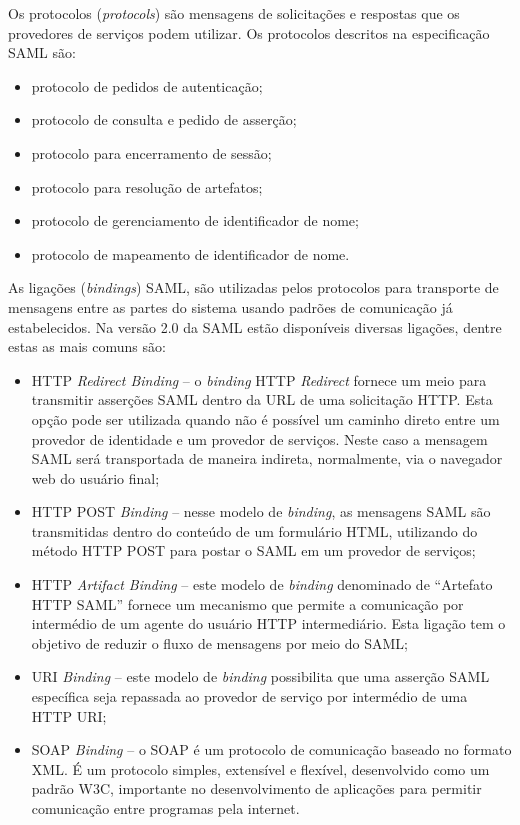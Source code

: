 Os protocolos (\textit{protocols}) são mensagens de solicitações e respostas que os provedores de serviços podem utilizar. Os protocolos descritos na especificação SAML são:

\begin{itemize}
 \item protocolo de pedidos de autenticação;
 \item protocolo de consulta e pedido de asserção;
 \item protocolo para encerramento de sessão;
 \item protocolo para resolução de artefatos;
 \item protocolo de gerenciamento de identificador de nome;
 \item protocolo de mapeamento de identificador de nome.
\end{itemize}

As ligações (\textit{bindings}) SAML, são utilizadas pelos protocolos para transporte de mensagens entre as partes do sistema usando padrões de comunicação já estabelecidos. Na versão 2.0 da SAML estão disponíveis diversas ligações, dentre estas as mais comuns são:

\begin{itemize}
 \item HTTP \textit{Redirect Binding} -- o \textit{binding} HTTP \textit{Redirect} fornece um meio para transmitir asserções SAML dentro da URL de uma solicitação HTTP. Esta opção pode ser utilizada quando não é possível um caminho direto entre um provedor de identidade e um provedor de serviços. Neste caso a mensagem SAML será transportada de maneira indireta, normalmente, via o navegador web do usuário final;
 \item HTTP POST \textit{Binding} -- nesse modelo de \textit{binding}, as mensagens SAML são transmitidas dentro do conteúdo de um formulário HTML, utilizando do método HTTP POST para postar o SAML em um provedor de serviços;
 \item HTTP \textit{Artifact Binding} -- este modelo de \textit{binding} denominado de “Artefato HTTP SAML” fornece um mecanismo que permite a comunicação por intermédio de um agente do usuário HTTP intermediário. Esta ligação tem o objetivo de reduzir o fluxo de mensagens por meio do SAML;
 \item URI \textit{Binding} -- este modelo de \textit{binding} possibilita que uma asserção SAML específica seja repassada ao provedor de serviço por intermédio de uma HTTP URI;
 \item SOAP \textit{Binding} -- o SOAP é um protocolo de comunicação baseado no formato XML. É um protocolo simples, extensível e flexível, desenvolvido como um padrão W3C, importante no desenvolvimento de aplicações para permitir comunicação entre programas pela internet.
\end{itemize}

